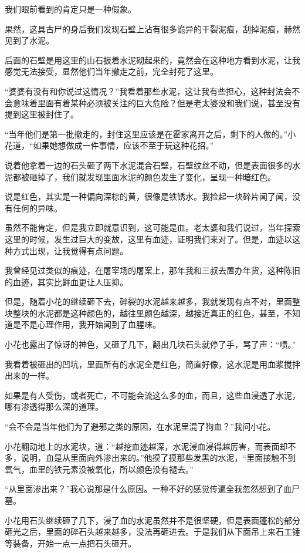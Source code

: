 我们眼前看到的肯定只是一种假象。

果然，这具古尸的身后我们发现石壁上沾有很多诡异的干裂泥痕，刮掉泥痕，赫然见到了水泥。

后面的石壁是用这里的山石扳着水泥砌起来的，竟然会在这种地方看到水泥，让我感觉无法接受，显然他们当年撤走之前，完全封死了这里。

“婆婆有没有和你说过这情况？”我看着那些水泥，这让我有些担心，这种封法会不会意味着里面有着某种必须被关注的巨大危险？但是老太婆没和我们说，甚至没有提到这里被封住了。

“当年他们是第一批撤走的，封住这里应该是在霍家离开之后，剩下的人做的。”小花道，“如果她想做成一件事情，应该不至于玩这种花招。”

说着他拿着一边的石头砸了两下水泥混合石壁，石壁纹丝不动，但是表面很多的水泥都被砸掉了，我们就发现里面水泥的颜色发生了变化，呈现一种暗红色。

说是红色，其实是一种偏向深棕的黄，很像是铁锈水。我捡起一块碎片闻了闻，没有任何的异味。

虽然不能肯定，但是我立即就意识到，这可能是血。老太婆和我们说过，当年探索这里的时候，发生过巨大的变故，这里有血迹，证明我们来对了。但是，血迹以这种方式出现，让我觉得有点问题。

我曾经见过类似的痕迹，在屠宰场的屠案上，那年我和三叔去置办年货，这种陈旧的血迹，其实比鲜血更让人压抑。

但是，随着小花的继续砸下去，碎裂的水泥越来越多，我就发现有点不对，里面整块整块的水泥都是这种颜色的，越往里颜色越深，越接近真正的红色，甚至，不知道是不是心理作用，我开始闻到了血腥味。

小花也露出了惊讶的神色，又砸了几下，翻出几块石头就停了手，骂了声：“啧。”

我看着被砸出的凹坑，里面所有的水泥全是红色，简直好像，这水泥是用血浆搅拌出来的一样。

如果是有人受伤，或者死亡，不可能会流这么多的血，而且，这些血浸透了水泥，哪有渗透得那么深的道理。

“会不会是当年他们为了避邪之类的原因，在水泥里混了狗血？”我问小花。

小花翻动地上的水泥块，道：“越挖血迹越深，水泥浸血浸得越厉害，而表面却不多，说明，血是从里面向外渗出来的。”他摸了摸那些发黑的水泥，“里面接触不到氧气，血里的铁元素没被氧化，所以颜色没有褪去。”

“从里面渗出来？”我心说那是什么原因。一种不好的感觉传遍全我忽然想到了血尸墓。

小花用石头继续砸了几下，浸了血的水泥虽然并不是很坚硬，但是表面蓬松的部分砸光之后，里面的碎石头越来越多，没法再砸进去。于是我们从下面吊上来石工锤等装备，开始一点一点把石头砸开。


